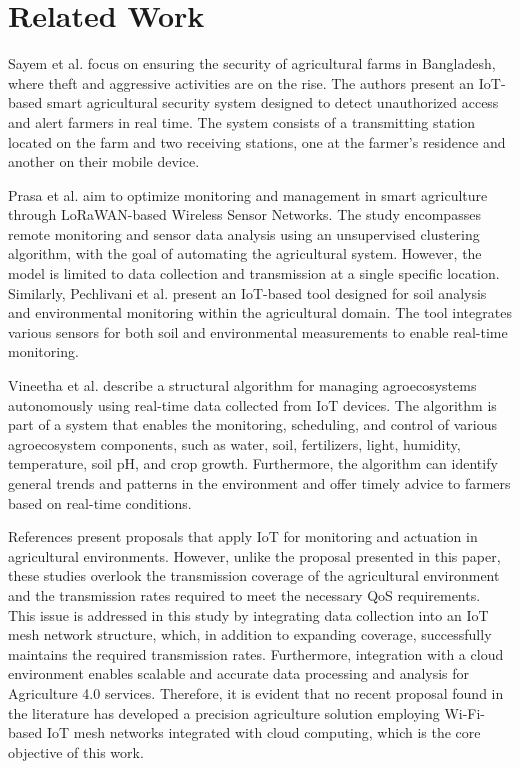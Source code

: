\documentclass[journal]{IEEEtran}
\begin{document}
\section{Related Work}

Sayem et al. \cite{SAYEM2023100358} focus on ensuring the security of agricultural farms in Bangladesh, where theft and aggressive activities are on the rise. The authors present an IoT-based smart agricultural security system designed to detect unauthorized access and alert farmers in real time. The system consists of a transmitting station located on the farm and two receiving stations, one at the farmer's residence and another on their mobile device.

Prasa et al. \cite{doi-10-1080-01430750-2021-1953591} aim to optimize monitoring and management in smart agriculture through LoRaWAN-based Wireless Sensor Networks. The study encompasses remote monitoring and sensor data analysis using an unsupervised clustering algorithm, with the goal of automating the agricultural system. However, the model is limited to data collection and transmission at a single specific location. Similarly, Pechlivani et al. \cite{mi14091698} present an IoT-based tool designed for soil analysis and environmental monitoring within the agricultural domain. The tool integrates various sensors for both soil and environmental measurements to enable real-time monitoring.

Vineetha et al. \cite{engproc2023059118} describe a structural algorithm for managing agroecosystems autonomously using real-time data collected from IoT devices. The algorithm is part of a system that enables the monitoring, scheduling, and control of various agroecosystem components, such as water, soil, fertilizers, light, humidity, temperature, soil pH, and crop growth. Furthermore, the algorithm can identify general trends and patterns in the environment and offer timely advice to farmers based on real-time conditions.

References \cite{SAYEM2023100358,doi-10-1080-01430750-2021-1953591,mi14091698,engproc2023059118} present proposals that apply IoT for monitoring and actuation in agricultural environments. However, unlike the proposal presented in this paper, these studies overlook the transmission coverage of the agricultural environment and the transmission rates required to meet the necessary QoS requirements. This issue is addressed in this study by integrating data collection into an IoT mesh network structure, which, in addition to expanding coverage, successfully maintains the required transmission rates. Furthermore, integration with a cloud environment enables scalable and accurate data processing and analysis for Agriculture 4.0 services. Therefore, it is evident that no recent proposal found in the literature has developed a precision agriculture solution employing Wi-Fi-based IoT mesh networks integrated with cloud computing, which is the core objective of this work.
\end{document}
